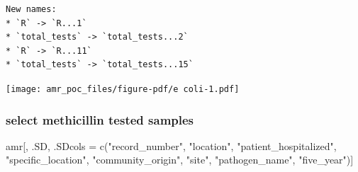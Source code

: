 \documentclass[
  letterpaper,
  DIV=11,
  numbers=noendperiod]{scrreprt}
\newenvironment{Shaded}{\begin{snugshade}}{\end{snugshade}}
\newcommand{\FunctionTok}[1]{\textcolor[rgb]{0.28,0.35,0.67}{#1}}
\newcommand{\NormalTok}[1]{\textcolor[rgb]{0.00,0.23,0.31}{#1}}
\newcommand{\OtherTok}[1]{\textcolor[rgb]{0.00,0.23,0.31}{#1}}
\newcommand{\StringTok}[1]{\textcolor[rgb]{0.13,0.47,0.30}{#1}}
\begin{document}
\begin{verbatim}
New names:
* `R` -> `R...1`
* `total_tests` -> `total_tests...2`
* `R` -> `R...11`
* `total_tests` -> `total_tests...15`
\end{verbatim}

\texttt{[image: amr\_poc\_files/figure-pdf/e coli-1.pdf]}

\subsubsection{select methicillin tested
samples}\label{select-methicillin-tested-samples}

\begin{Shaded}
\begin{Highlighting}[]
\NormalTok{amr[, .SD, .SDcols }\OtherTok{=} \FunctionTok{c}\NormalTok{(}\StringTok{"record\_number"}\NormalTok{, }\StringTok{"location"}\NormalTok{, }\StringTok{"patient\_hospitalized"}\NormalTok{, }\StringTok{"specific\_location"}\NormalTok{, }\StringTok{"community\_origin"}\NormalTok{, }\StringTok{"site"}\NormalTok{, }\StringTok{"pathogen\_name"}\NormalTok{, }\StringTok{"five\_year"}\NormalTok{)]}
\end{Highlighting}
\end{Shaded}
\end{document}
